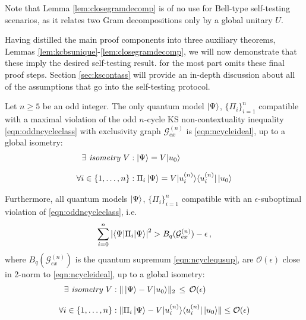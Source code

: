 Note that Lemma \ref{lem:closegramdecomp} is of no use for Bell-type self-testing scenarios, as it relates two Gram decompositions only by a global unitary $U$.

Having distilled the main proof components into three auxiliary theorems, Lemmas \ref{lem:kcbsunique}-\ref{lem:closegramdecomp}, we will now demonstrate that these imply the desired self-testing result. \cite{Bharti2019} for the most part omits these final proof steps. Section \ref{sec:kscontass} will provide an in-depth discussion about all of the assumptions that go into the self-testing protocol.

\begin{theorem}
\label{thm:contselftesting}\hfill\break
Let $n\geq5$ be an odd integer. The only quantum model $\ket{\Psi}$, $\{\Pi_i\}_{i=1}^n$ compatible with a maximal violation of the odd $n$-cycle KS non-contextuality inequality \ref{eqn:oddncycleclass} with exclusivity graph $\mathcal{G}_{ex}^{(n)}$ is \ref{eqn:ncycleideal}, up to a global isometry:
\begin{align*}
    \exists \emph{ isometry } V & : \ket{\Psi} = V \vert u_0\rangle \\[0.7em]
    \forall i\in\{1,\dots,n\} & : \Pi_i \ket{\Psi} = V \vert u_i^{(n)} \rangle \langle u_i^{(n)} \vert \thinspace \vert u_0 \rangle
\end{align*}

Furthermore, all quantum models $\ket{\Psi}$, $\{\Pi_i\}_{i=1}^n$ compatible with an $\epsilon$-suboptimal violation of \ref{eqn:oddncycleclass}, i.e.\
\begin{equation*}
    \sum_{i=0}^n \abs{\langle \Psi \vert \Pi_i \vert \Psi \rangle}^2> B_q(\mathcal{G}_{ex}^{(n)})-\epsilon\thinspace ,
\end{equation*}where $B_q(\mathcal{G}_{ex}^{(n)})$ is the quantum supremum \ref{eqn:ncyclequsup}, are $\mathcal{O}(\epsilon)$ close in 2-norm to \ref{eqn:ncycleideal}, up to a global isometry:
\begin{align*}
    \exists \emph{ isometry } V & : \| \ket{\Psi} - V \vert u_0\rangle \|_2 \thinspace\leq\thinspace \mathcal{O}(\epsilon)\\[0.7em]
    \forall i\in\{1,\dots,n\} & : \| \Pi_i \ket{\Psi} - V \vert u_i^{(n)} \rangle \langle u_i^{(n)} \vert \thinspace \vert u_0 \rangle \| \leq \mathcal{O}(\epsilon)
\end{align*}
\end{theorem}

